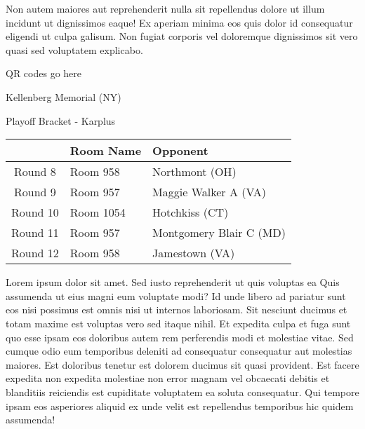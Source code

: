 \documentclass{article}%
\begin{document}
\newline%
Non autem maiores aut reprehenderit nulla sit repellendus dolore ut illum incidunt ut dignissimos eaque! Ex aperiam minima eos quis dolor id consequatur eligendi ut culpa galisum. Non fugiat corporis vel doloremque dignissimos sit vero quasi sed voluptatem explicabo.\newline%
\newline%
%
\vspace*{30pt}%
\begin{center}%
\begin{Huge}%
QR codes go here%
\end{Huge}%
\end{center}%
\newpage%
\begin{center}%
\begin{Huge}%
Kellenberg Memorial (NY)%
\end{Huge}%
\vspace*{8pt}%
\linebreak%
\begin{Large}%
Playoff Bracket {-} Karplus%
\end{Large}%
\end{center}%
\begin{tabularx}{\textwidth}{|c|Y|Y|}%
\hline%
&Room Name&Opponent\\%
\hline%
Round 8&Room 958&Northmont (OH)\\%
Round 9&Room 957&Maggie Walker A (VA)\\%
Round 10&Room 1054&Hotchkiss (CT)\\%
Round 11&Room 957&Montgomery Blair C (MD)\\%
Round 12&Room 958&Jamestown (VA)\\%
\hline%
\end{tabularx}%
\vspace*{8pt}%
\linebreak%
\newline%
\newline%
Lorem ipsum dolor sit amet. Sed iusto reprehenderit ut quis voluptas ea Quis assumenda ut eius magni eum voluptate modi? Id unde libero ad pariatur sunt eos nisi possimus est omnis nisi ut internos laboriosam. Sit nesciunt ducimus et totam maxime est voluptas vero sed itaque nihil. Et expedita culpa et fuga sunt quo esse ipsam eos doloribus autem rem perferendis modi et molestiae vitae.\newline%
\newline%
Sed cumque odio eum temporibus deleniti ad consequatur consequatur aut molestias maiores. Est doloribus tenetur est dolorem ducimus sit quasi provident. Est facere expedita non expedita molestiae non error magnam vel obcaecati debitis et blanditiis reiciendis est cupiditate voluptatem ea soluta consequatur. Qui tempore ipsam eos asperiores aliquid ex unde velit est repellendus temporibus hic quidem assumenda!\newline%
\end{document}
